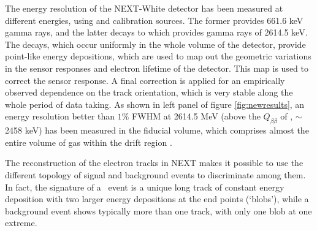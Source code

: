 The energy resolution of the NEXT-White detector has been measured at different energies, using  and  calibration sources. The former provides 661.6 keV gamma rays, and the latter decays to  which provides gamma rays of 2614.5 keV. The  decays, which occur uniformly in the whole volume of the detector, provide point-like energy depositions, which are used to map out the geometric variations in the sensor responses and electron lifetime of the detector. This map is used to correct the sensor response. A final correction is applied for an empirically observed dependence on the track orientation, which is very stable along the whole period of data taking. As shown in left panel of figure \ref{fig:newresults}, an energy resolution better than $1\%$ FWHM at 2614.5 MeV (above the $Q_{\beta\beta}$ of , $\sim$2458 keV) has been measured in the fiducial volume, which comprises almost the entire volume of gas within the drift region \cite{Renner:2019pfe}.

\indent


The reconstruction of the electron tracks in NEXT makes it possible to use the different topology of signal and background events to discriminate among them. In fact, the signature of a \bbonu ~event is a unique long track of constant energy deposition with two larger energy depositions at the end points (‘blobs’), while a background event shows typically more than one track, with only one blob at one extreme. 

\indent


